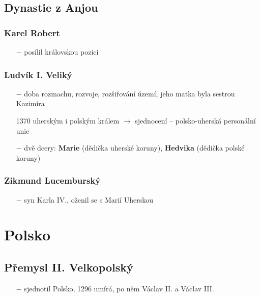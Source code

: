 \documentclass{article}
\begin{document}
\subsection*{Dynastie z Anjou}
\subsubsection*{Karel Robert}
\begin{itemize}
    \vspace{-0.5em}
    \setlength\itemsep{0.15em}
    \item[$-$] posílil královskou pozici
\end{itemize}

\subsubsection*{Ludvík I. Veliký}
\begin{itemize}
    \vspace{-0.5em}
    \setlength\itemsep{0.15em}
    \item[$-$] doba rozmachu, rozvoje, rozšiřování území, jeho matka byla sestrou Kazimíra
    \item[1370] uherským i polským králem $\rightarrow$ sjednocení -- polsko-uherská personální unie
    \item[$-$] dvě dcery: \textbf{Marie} (dědička uherské koruny), \textbf{Hedvika} (dědička polské koruny)
\end{itemize}

\subsubsection*{Zikmund Lucemburský}
\begin{itemize}
    \vspace{-0.5em}
    \setlength\itemsep{0.15em}
    \item[$-$] syn Karla IV., oženil se s Marií Uherskou
\end{itemize}

\section*{Polsko}
\subsection*{Přemysl II. Velkopolský}
\begin{itemize}
    \vspace{-0.5em}
    \setlength\itemsep{0.15em}
    \item[$-$] sjednotil Polsko, 1296 umírá, po něm Václav II. a Václav III.
\end{itemize}
\end{document}
